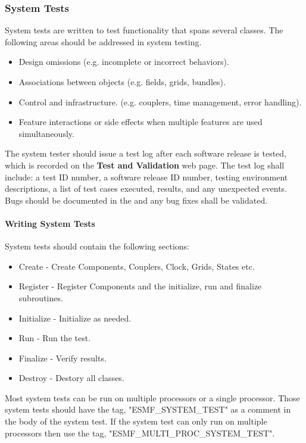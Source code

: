 \subsubsection{System Tests}

System tests are written to test functionality that spans several
classes.  The following areas should be addressed in system testing.

\begin{itemize}
\item Design omissions (e.g. incomplete or incorrect behaviors).
\item Associations between objects (e.g. fields, grids, bundles).
\item Control and infrastructure. (e.g. couplers, time management, error handling).
\item Feature interactions or side effects when multiple features are used
simultaneously.
\end{itemize}

The system tester should issue a test log after each software release is tested,
which is recorded on the {\bf Test and Validation} web page. The test
log shall
include: a test ID number, a software release ID number, testing environment
descriptions, a list of test cases executed, results, and any unexpected
events. Bugs should be documented in the  and
any bug fixes shall be validated.

\paragraph{Writing System Tests}

System tests should contain the following sections:
\begin{itemize}
\item Create - Create Components, Couplers, Clock, Grids, States etc.
\item Register - Register Components and the initialize, run and finalize subroutines.
\item Initialize - Initialize as needed.
\item Run - Run the test.
\item Finalize - Verify results.
\item Destroy - Destory all classes.
\end{itemize}

Most system tests can be run on multiple processors or a single processor. Those system tests should
have the tag, "ESMF\_SYSTEM\_TEST" as a comment in the body of the system test. If the system test
can only run on multiple processors then use the tag, "ESMF\_MULTI\_PROC\_SYSTEM\_TEST".

